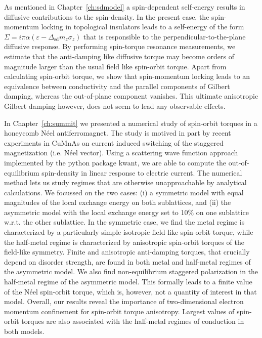 As mentioned in Chapter~\ref{ch:sdmodel} a spin-dependent self-energy results in diffusive contributions to the spin-density. In the present case, the spin-momentum locking in topological insulators leads to a self-energy of the form $\Sigma = i\pi\alpha(\varepsilon-\Delta_\text{sd} m_z \sigma_z)$ that is responsible to the perpendicular-to-the-plane diffusive response. By performing spin-torque resonance measurements, we estimate that the anti-damping like diffusive torque may become orders of magnitude larger than the usual field like spin-orbit torque. Apart from calculating spin-orbit torque, we show that spin-momentum locking leads to an equivalence between conductivity and the parallel components of Gilbert damping, whereas the out-of-plane component vanishes. This ultimate anisotropic Gilbert damping however, does not seem to lead any observable effects. 

In Chapter~\ref{ch:summit} we presented a numerical study of spin-orbit torques in a honeycomb N\'eel antiferromagnet. The study is motived in part by recent experiments in CuMnAs on current induced switching of the staggered magnetization (i.e. N\'eel vector). Using a scattering wave function approach implemented by the python package kwant, we are able to compute the out-of-equilibrium spin-density in linear response to electric current. The numerical method lets us study regimes that are otherwise unapproachable by analytical calculations. We focussed on the two cases: (i) a symmetric model with equal magnitudes of the local exchange energy on both sublattices, and (ii) the asymmetric model with the local exchange energy set to 10\% on one sublattice w.r.t. the other sublattice. In the symmetric case, we find the metal regime is characterized by a particularly simple isotropic field-like spin-orbit torque, while the half-metal regime is characterized by anisotropic spin-orbit torques of the field-like symmetry.  Finite and anisotropic anti-damping torques, that crucially depend on disorder strength, are found in both metal and half-metal regimes of the asymmetric model. We also find non-equilibrium staggered polarization in the half-metal regime of the asymmetric model. This formally leads to a finite value of the N\'eel spin-orbit torque, which is, however, not a quantity of interest in that model. Overall, our results reveal the importance of two-dimensional electron momentum confinement for spin-orbit torque anisotropy. Largest values of spin-orbit torques are also associated with the half-metal regimes of conduction in both models. 

